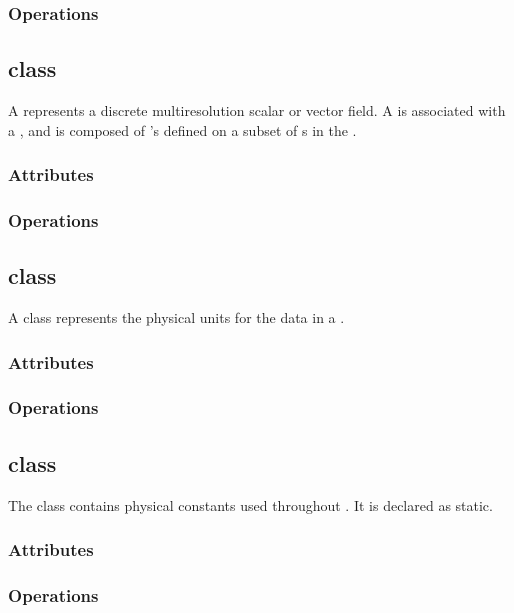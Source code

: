 \documentclass{article}
\begin{document}
\subsubsection{Operations}

\subsection{ class}

A  represents a discrete multiresolution scalar or vector
field.  A  is associated with a , and is
composed of 's defined on a subset of s in the
.

\subsubsection{Attributes}

\subsubsection{Operations}

\subsection{ class}

A  class represents the physical units for the data in a
.

\subsubsection{Attributes}

\subsubsection{Operations}

\subsection{ class}

The  class contains physical constants used throughout
\cello.  It is declared as static.

\subsubsection{Attributes}

\subsubsection{Operations}

\end{document}
